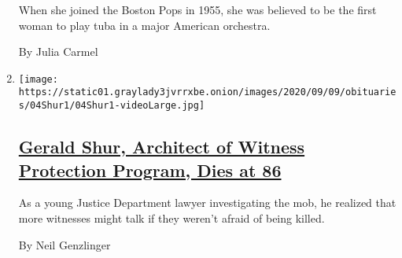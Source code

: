 \begin{enumerate}
  When she joined the Boston Pops in 1955, she was believed to be the
  first woman to play tuba in a major American orchestra.

  By Julia Carmel
\item
  \texttt{[image: https://static01.graylady3jvrrxbe.onion/images/2020/09/09/obituaries/04Shur1/04Shur1-videoLarge.jpg]}

  \hypertarget{gerald-shur-architect-of-witness-protection-program-dies-at-86}{%
  \subsection{\texorpdfstring{\href{/2020/09/06/us/gerald-shur-dead.html}{Gerald
  Shur, Architect of Witness Protection Program, Dies at
  86}}{Gerald Shur, Architect of Witness Protection Program, Dies at 86}}\label{gerald-shur-architect-of-witness-protection-program-dies-at-86}}

  As a young Justice Department lawyer investigating the mob, he
  realized that more witnesses might talk if they weren't afraid of
  being killed.

  By Neil Genzlinger
\end{enumerate}

